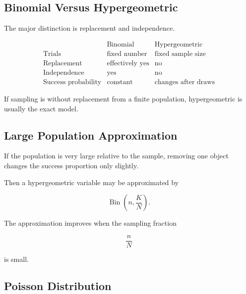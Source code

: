 \subsection{Binomial Versus Hypergeometric}
\label{subsec:binomial-versus-hypergeometric}

The major distinction is replacement and independence.

\[
\begin{array}{c|c|c}
&
\text{Binomial}
&
\text{Hypergeometric}
\\
\hline
\text{Trials}
&
\text{fixed number}
&
\text{fixed sample size}
\\
\text{Replacement}
&
\text{effectively yes}
&
\text{no}
\\
\text{Independence}
&
\text{yes}
&
\text{no}
\\
\text{Success probability}
&
\text{constant}
&
\text{changes after draws}
\end{array}
\]

If sampling is without replacement from a finite population,
hypergeometric is usually the exact model.

\subsection{Large Population Approximation}
\label{subsec:hypergeometric-binomial-approximation}

If the population is very large relative to the sample, removing one
object changes the success proportion only slightly.

Then a hypergeometric variable may be approximated by

\[
\boxed{
\operatorname{Bin}\left(n,\frac KN\right).
}
\]

The approximation improves when the sampling fraction

\[
\frac nN
\]

is small.

\subsection{Poisson Distribution}
\label{subsec:poisson-distribution}

